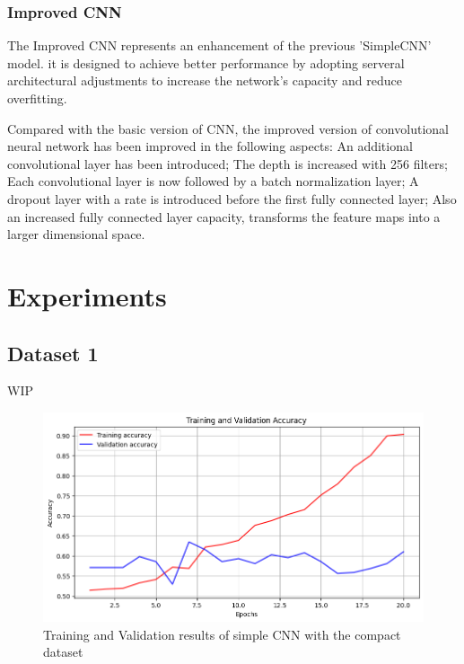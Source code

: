 \documentclass[final]{cvpr}
\begin{document}
\subsubsection{Improved CNN}

The Improved CNN represents an enhancement of the previous 'SimpleCNN' model. it is designed to achieve better performance by adopting serveral architectural adjustments to increase the network's capacity and reduce overfitting.

Compared with the basic version of CNN, the improved version of convolutional neural network has been improved in the following aspects: An additional convolutional layer has been introduced; The depth is increased with 256 filters; Each convolutional layer is now followed by a batch normalization layer; A dropout layer with a rate is introduced before the first fully connected layer; Also an increased fully connected layer capacity, transforms the feature maps into a larger dimensional space.


\section{Experiments}

\subsection{Dataset 1}

WIP

\begin{figure}[t]
   \centering
   \includegraphics[width=0.9\linewidth]{img/ex-d1-simplecnn-accuracy-results.png}
   \caption{Training and Validation results of simple CNN with the compact dataset}
   \label{fig:ex-d1-simplecnn-results}
\end{figure}
\end{document}
